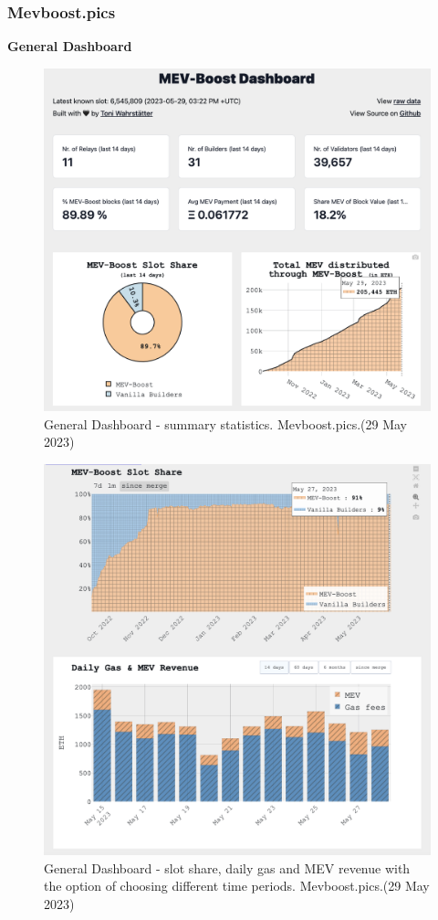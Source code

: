 \documentclass[UTF8]{article}
\begin{document}
\clearpage
\subsubsection*{Mevboost.pics}
\textbf{General Dashboard} \\
\begin{figure}[htbp]
\begin{center}
\includegraphics[width=0.9\linewidth]{images/mevhome1}
\caption{General Dashboard - summary statistics. Mevboost.pics.(29 May 2023)}
\label{fig:mevhome1}
\end{center}
\end{figure}

\begin{figure}[htbp]
\begin{center}
\includegraphics[width=0.9\linewidth]{images/mevhome2}
\caption{General Dashboard - slot share, daily gas and MEV revenue with the option of choosing different time periods. Mevboost.pics.(29 May 2023)}
\label{fig:mevhome2}
\end{center}
\end{figure}
\end{document}
